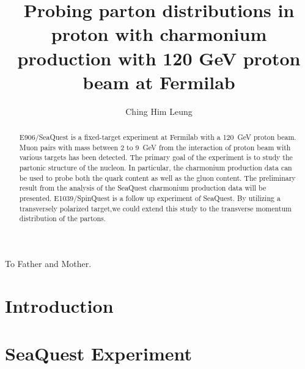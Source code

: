 \documentclass{uiucthesis2021}
\begin{document}
\title{Probing parton distributions in proton with charmonium production with
	120 GeV proton beam at Fermilab}
\author{Ching Him Leung}
\phdthesis
{}
\maketitle

\frontmatter

\begin{abstract}
E906/SeaQuest is a fixed-target experiment at Fermilab with a \SI{120}{\GeV} 
proton beam. Muon pairs with mass between \num{2} to \SI{9}{\GeV} from the 
interaction of proton beam with various targets has been detected. The primary 
goal of the experiment is to study the partonic structure of the nucleon. In 
particular, the charmonium production data can be used to probe both the quark 
content as well as the gluon content. The preliminary result from the analysis 
of the SeaQuest charmonium production data will be presented.  E1039/SpinQuest 
is a follow up experiment of SeaQuest. By utilizing a transversely polarized 
target,we could extend this study to the transverse momentum distribution of 
the partons. 
\end{abstract}

\begin{dedication}
To Father and Mother.
\end{dedication}



{
	\hypersetup{linkcolor=black}  %
	\tableofcontents
	\listoffigures
}


\mainmatter

\chapter{Introduction}


\chapter{SeaQuest Experiment}

\end{document}
